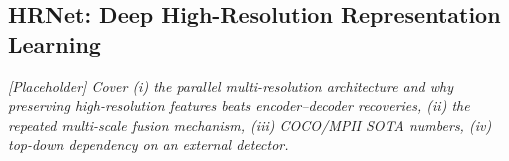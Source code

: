 \documentclass[11pt]{article}
\begin{document}

\subsection{HRNet: Deep High-Resolution Representation Learning}
\textit{[Placeholder] Cover (i) the parallel multi-resolution architecture and
why preserving high-resolution features beats encoder--decoder recoveries,
(ii) the repeated multi-scale fusion mechanism, (iii) COCO/MPII SOTA numbers,
(iv) top-down dependency on an external detector.}
\end{document}
